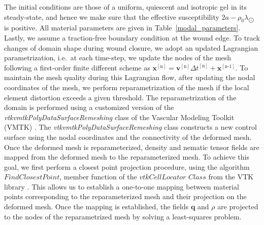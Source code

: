 The initial conditions are those of a uniform, quiescent and isotropic gel in its steady-state, and hence we make sure that the effective susceptibility $2a -  \rho_0\lambda_{\bigodot}$ is positive.
All material parameters are given in Table~\ref{modal_parameters}. Lastly, we assume a traction-free boundary condition at the wound edge. 
To track changes of domain shape during wound closure, we adopt an updated  Lagrangian parametrization, i.e.~at each time-step, we update the nodes of the mesh following a first-order finite different scheme as $\bm{x}^{[\text{n}]}  = \bm{v}^{[\text{n}]}\Delta t^{[\text{n}]}+ \bm{x}^{[\text{n-1}]}$. To maintain the mesh quality during this Lagrangian flow, after updating the nodal coordinates of the mesh, we perform reparametrization of the mesh if the local element distortion  exceeds a given threshold. The reparametrization of the domain is performed using a customized version of the \textit{vtkvmtkPolyDataSurfaceRemeshing} class of the Vascular Modeling Toolkit (VMTK) \cite{antiga2008}. The \textit{vtkvmtkPolyDataSurfaceRemeshing} class constructs a new control surface using the nodal coordinates and the connectivity of the deformed mesh. Once the deformed mesh is reparameterized, density and nematic tensor fields  are mapped from the deformed mesh to the reparameterized mesh. To achieve this goal, we first perform a closest point projection procedure, using the algorithm $\textit{FindClosestPoint}$, member function of the $\textit{vtkCellLocator Class}$ from the VTK library \cite{schroeder2003}. This allows us to establish a one-to-one mapping between material points corresponding to the reparameterized mesh and their projection on the deformed mesh. Once the mapping is established, the fields $\bm{q}$ and $\rho$ are projected to the nodes of the reparametrized mesh by solving a least-squares problem. 

